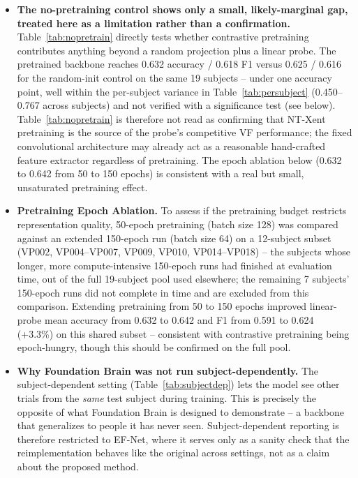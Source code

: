 \documentclass[journal]{IEEEtran}
\begin{document}
\begin{itemize}
\item \textbf{The no-pretraining control shows only a small, likely-marginal gap, treated here as a limitation rather than a confirmation.} Table~\ref{tab:nopretrain} directly tests whether contrastive pretraining contributes anything beyond a random projection plus a linear probe. The pretrained backbone reaches 0.632 accuracy / 0.618 F1 versus 0.625 / 0.616 for the random-init control on the same 19 subjects -- under one accuracy point, well within the per-subject variance in Table~\ref{tab:persubject} (0.450--0.767 across subjects) and not verified with a significance test (see below). Table~\ref{tab:nopretrain} is therefore not read as confirming that NT-Xent pretraining is the source of the probe's competitive VF performance; the fixed convolutional architecture may already act as a reasonable hand-crafted feature extractor regardless of pretraining. The epoch ablation below (0.632 to 0.642 from 50 to 150 epochs) is consistent with a real but small, unsaturated pretraining effect.

\item \textbf{Pretraining Epoch Ablation.} To assess if the pretraining budget restricts representation quality, 50-epoch pretraining (batch size 128) was compared against an extended 150-epoch run (batch size 64) on a 12-subject subset (VP002, VP004--VP007, VP009, VP010, VP014--VP018) -- the subjects whose longer, more compute-intensive 150-epoch runs had finished at evaluation time, out of the full 19-subject pool used elsewhere; the remaining 7 subjects' 150-epoch runs did not complete in time and are excluded from this comparison. Extending pretraining from 50 to 150 epochs improved linear-probe mean accuracy from 0.632 to 0.642 and F1 from 0.591 to 0.624 (+3.3\%) on this shared subset -- consistent with contrastive pretraining being epoch-hungry, though this should be confirmed on the full pool.

\item \textbf{Why Foundation Brain was not run subject-dependently.} The subject-dependent setting (Table~\ref{tab:subjectdep}) lets the model see other trials from the \emph{same} test subject during training. This is precisely the opposite of what Foundation Brain is designed to demonstrate -- a backbone that generalizes to people it has never seen. Subject-dependent reporting is therefore restricted to EF-Net, where it serves only as a sanity check that the reimplementation behaves like the original across settings, not as a claim about the proposed method.


\end{itemize}
\end{document}
